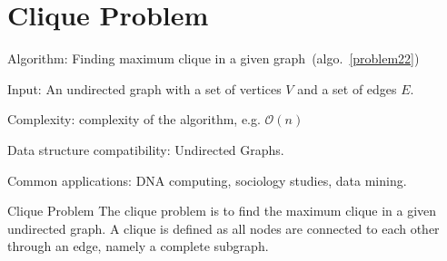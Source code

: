 \documentclass{article}
\begin{document}
\fi

%
%

\def\pbname{Clique Problem} %

\section{\pbname} 

\begin{overview}
\item [Algorithm:] Finding maximum clique in a given graph~(algo.~\ref{problem22}) 
\item [Input:] An undirected graph with a set of vertices $V$ and a set of edges $E$.
\item [Complexity:] complexity of the algorithm, e.g. $\mathcal{O}(n)$
\item [Data structure compatibility:] Undirected Graphs.
\item [Common applications:] DNA computing, sociology studies, data mining.%
\end{overview}

\begin{problem}{\pbname}
	The clique problem is to find the maximum clique in a given undirected graph. A clique is defined as all nodes are connected to each other through an edge, namely a complete subgraph.
\end{problem} 
\end{document}
